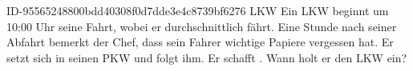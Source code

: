 \begin{exercise}
      {ID-95565248800bdd40308f0d7dde3e4c8739bf6276}
      {LKW}
  \ifproblem\problem
    Ein LKW beginnt um 10:00 Uhr seine Fahrt, wobei er durchschnittlich 
    fährt. Eine Stunde nach seiner Abfahrt bemerkt der Chef, dass sein Fahrer
    wichtige Papiere vergessen hat. Er setzt sich in seinen PKW und folgt ihm.
    Er schafft . Wann holt er den LKW ein?
  \fi
\end{exercise}
